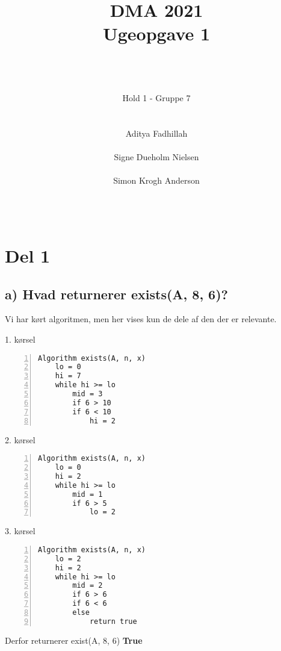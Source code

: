 \documentclass{article}
\begin{document}
\begin{titlepage}
\title{\Huge DMA 2021 \\ Ugeopgave 1} 
\author{\\\\\\ \Large Hold 1 - Gruppe 7 \\\\\\ Aditya Fadhillah \\\\ Signe Dueholm Nielsen \\\\ Simon Krogh Anderson\\\\\\}
\maketitle
\thispagestyle{empty}   
\end{titlepage}



\section*{Del 1} \subsection*{a) Hvad returnerer exists(A, 8, 6)?}

Vi har kørt algoritmen, men her vises kun de dele af den der er relevante.

1. kørsel
\begin{Verbatim}[frame=lines,label=Algorithm exists,labelposition=topline, numbers=left]
Algorithm exists(A, n, x)
    lo = 0
    hi = 7
    while hi >= lo
        mid = 3 
        if 6 > 10 
        if 6 < 10
            hi = 2
\end{Verbatim}

2. kørsel
\begin{Verbatim}[frame=lines,label=Algorithm exists,labelposition=topline, numbers=left]
Algorithm exists(A, n, x)
    lo = 0
    hi = 2
    while hi >= lo
        mid = 1 
        if 6 > 5 
            lo = 2
\end{Verbatim}

3. kørsel
\begin{Verbatim}[frame=lines,label=Algorithm exists,labelposition=topline, numbers=left]
Algorithm exists(A, n, x)
    lo = 2
    hi = 2
    while hi >= lo
        mid = 2 
        if 6 > 6 
        if 6 < 6
        else 
            return true
\end{Verbatim}
Derfor returnerer exist(A, 8, 6) \textbf{True} \newpage
\end{document}

